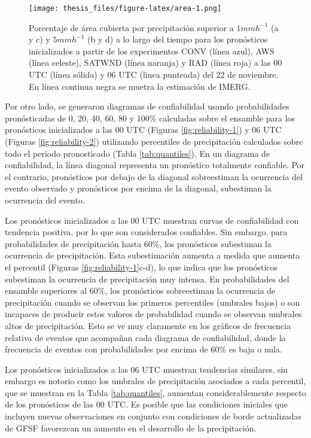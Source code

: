 \documentclass[12pt,oneside]{reedthesis}
\begin{document}
\begin{figure}
\centering
\texttt{[image: thesis\_files/figure-latex/area-1.png]}
\caption{\label{fig:area}Porcentaje de área cubierta por precipitación superior a \(1 mmh^{-1}\) (a y c) y \(5 mmh^{-1}\) (b y d) a lo largo del tiempo para los pronósticos inicializados a partir de los experimentos CONV (línea azul), AWS (línea celeste), SATWND (línea naranja) y RAD (línea roja) a las 00 UTC (línea sólida) y 06 UTC (linea punteada) del 22 de noviembre. En línea continua negra se muetra la estimación de IMERG.}
\end{figure}
Por otro lado, se generaron diagramas de confiabilidad usando probabilidades pronósticadas de 0, 20, 40, 60, 80 y 100\% calculadas sobre el ensamble para los pronósticos inicializados a las 00 UTC (Figuras \ref{fig:reliability-1}) y 06 UTC (Figuras \ref{fig:reliability-2}) utilizando percentiles de precipitación calculados sobre todo el periodo pronosticado (Tabla \ref{tab:quantiles}). En un diagrama de confiabilidad, la línea diagonal representa un pronóstico totalmente confiable. Por el contrario, pronósticos por debajo de la diagonal sobreestiman la ocurrencia del evento observado y pronósticos por encima de la diagonal, subestiman la ocurrencia del evento.

Los pronósticos inicializados a las 00 UTC muestran curvas de confiabilidad con tendencia positiva, por lo que son considerados confiables. Sin embargo, para probabilidades de precipitación hasta 60\%, los pronósticos subestiman la ocurrencia de precipitación. Esta subestimación aumenta a medida que aumenta el percentil (Figuras \ref{fig:reliability-1}c-d), lo que indica que los pronósticos subestiman la ocurrencia de precipitación muy intensa. En probabilidades del ensamble superiores al 60\%, los pronósticos sobreestiman la ocurrencia de precipitación cuando se observan los primeros percentiles (umbrales bajos) o son incapaces de producir estos valores de probabilidad cuando se observan umbrales altos de precipitación. Esto se ve muy claramente en los gráficos de frecuencia relativa de eventos que acompañan cada diagrama de confiabilidad, donde la frecuencia de eventos con probabilidades por encima de 60\% es baja o nula.

Los pronósticos inicializados a las 06 UTC muestran tendencias similares, sin embargo es notorio como los umbrales de precipitación asociados a cada percentil, que se muestran en la Tabla \ref{tab:quantiles}, aumentan considerablemente respecto de los pronósticos de las 00 UTC. Es posible que las condiciones iniciales que incluyen nuevas observaciones en conjunto con condiciones de borde actualizadas de GFSF favorezcan un aumento en el desarrollo de la precipitación.
\end{document}
